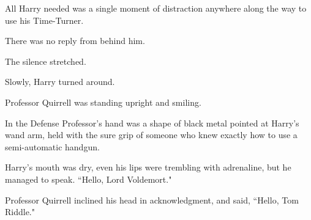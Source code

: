 All Harry needed was a single moment of distraction anywhere along the way to use his Time-Turner.

There was no reply from behind him.

The silence stretched.

Slowly, Harry turned around.

Professor Quirrell was standing upright and smiling.

In the Defense Professor's hand was a shape of black metal pointed at Harry's wand arm, held with the sure grip of someone who knew exactly how to use a semi-automatic handgun.

Harry's mouth was dry, even his lips were trembling with adrenaline, but he managed to speak. ``Hello, Lord Voldemort."

Professor Quirrell inclined his head in acknowledgment, and said, ``Hello, Tom Riddle."

